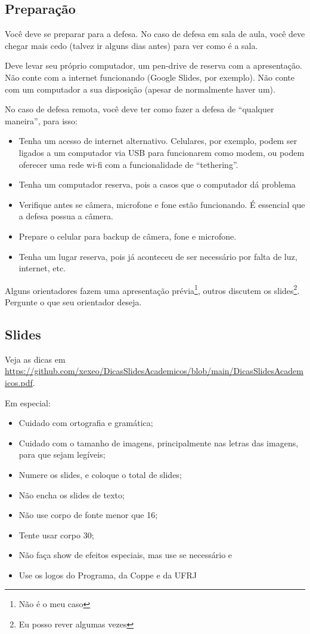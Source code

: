 \documentclass[a4paper,12pt]{article}
\begin{document}
\subsection{Preparação}

Você deve se preparar para a defesa. No caso de defesa em sala de aula, você deve chegar mais cedo (talvez ir alguns dias antes) para ver como é a sala. 

Deve levar seu próprio computador, um pen-drive de reserva com a apresentação. Não conte com a internet funcionando (Google Slides, por exemplo). Não conte com um computador a sua disposição (apesar de normalmente haver um). 

No caso de defesa remota, você deve ter como fazer a defesa de ``qualquer maneira'', para isso:
\begin{itemize}
    \item Tenha um acesso de internet alternativo. Celulares, por exemplo, podem ser ligados a um computador via USB para funcionarem como modem, ou podem oferecer uma rede wi-fi com a funcionalidade de ``tethering''.
    \item Tenha um computador reserva, pois a casos que o computador dá problema
    \item Verifique antes se câmera, microfone e fone estão funcionando. É essencial que a defesa possua a câmera.
    \item Prepare o celular para backup de câmera, fone e microfone.
    \item Tenha um lugar reserva, pois já aconteceu de ser necessário por falta de luz, internet, etc. 
\end{itemize}

Alguns orientadores fazem uma apresentação prévia\footnote{Não é o meu caso}, outros discutem os slides\footnote{Eu posso rever algumas vezes}. Pergunte o que seu orientador deseja.



\subsection{Slides}

Veja as dicas em \url{https://github.com/xexeo/DicasSlidesAcademicos/blob/main/DicasSlidesAcademicos.pdf}.

Em especial:
\begin{itemize}
    \item Cuidado com ortografia e gramática;
    \item Cuidado com o tamanho de imagens, principalmente nas letras das imagens, para que sejam legíveis;
    \item Numere os slides, e coloque o total de slides;
    \item Não encha os slides de texto;
    \item Não use corpo de fonte menor que 16;
    \item Tente usar corpo 30;
    \item Não faça show de efeitos especiais, mas use se necessário e
    \item Use os logos do Programa, da Coppe e da UFRJ
\end{itemize}
\end{document}
